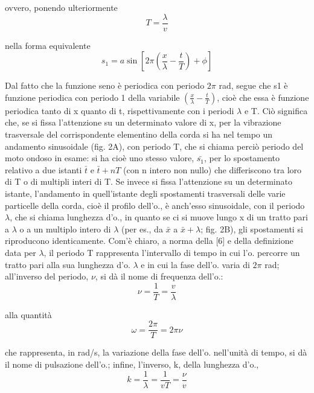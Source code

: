 \documentclass[a4paper]{article}
\begin{document}
ovvero, ponendo ulteriormente 
\begin{equation}
T=\frac{\lambda}{v}
\end{equation}

nella forma equivalente 
\begin{equation}
s_1=a\sin [2\pi(\frac{x}{\lambda}-\frac{t}{T})+\phi]
\end{equation}

Dal fatto che la funzione seno è periodica con periodo $2\pi$ rad, segue che s1 è funzione periodica con periodo 1 della variabile $(\frac{x}{\lambda}-\frac{t}{T})$, cioè che essa è funzione periodica tanto di x quanto di t, rispettivamente con i periodi $\lambda$ e T. Ciò significa che, se si fissa l'attenzione su un determinato valore di x, per la vibrazione trasversale del corrispondente elementino della corda si ha nel tempo un andamento sinusoidale (fig. 2A), con periodo T, che si chiama perciò periodo del moto ondoso in esame: si ha cioè uno stesso valore, $\bar{s_1}$, per lo spostamento relativo a due istanti $\bar{t}$ e $\bar{t} + nT$ (con n intero non nullo) che differiscono tra loro di T o di multipli interi di T. Se invece si fissa l'attenzione su un determinato istante, l'andamento in quell'istante degli spostamenti trasversali delle varie particelle della corda, cioè il profilo dell'o., è anch'esso sinusoidale, con il periodo $\lambda$, che si chiama lunghezza d'o., in quanto se ci si muove lungo x di un tratto pari a $\lambda$ o a un multiplo intero di $\lambda$ (per es., da $\bar{x}$ a $\bar{x}+\lambda$; fig. 2B), gli spostamenti si riproducono identicamente. Com'è chiaro, a norma della [6] e della definizione data per $\lambda$, il periodo T rappresenta l'intervallo di tempo in cui l'o. percorre un tratto pari alla sua lunghezza d'o. $\lambda$ e in cui la fase dell'o. varia di $2\pi$ rad; all'inverso del periodo, $\nu$, si dà il nome di frequenza dell'o.: 
\begin{equation}
\nu=\frac{1}{T}=\frac{v}{\lambda}
\end{equation}

alla quantità
\begin{equation}
\omega=\frac{2\pi}{T}=2\pi\nu
\end{equation}

che rappresenta, in rad/s, la variazione della fase dell'o. nell'unità di tempo, si dà il nome di pulsazione dell'o.; infine, l'inverso, k, della lunghezza d'o., 
\begin{equation}
k=\frac{1}{\lambda}=\frac{1}{vT}=\frac{\nu}{v}
\end{equation}
\end{document}
